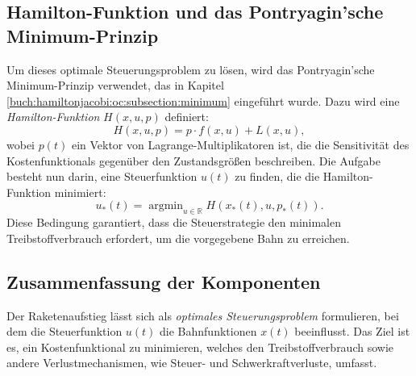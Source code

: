 \subsection{Hamilton-Funktion und das Pontryagin’sche Minimum-Prinzip}

Um dieses optimale Steuerungsproblem zu lösen, wird das Pontryagin'sche Minimum-Prinzip verwendet, das in Kapitel \ref{buch:hamiltonjacobi:oc:subsection:minimum} eingeführt wurde. Dazu wird eine \textit{Hamilton-Funktion} \(H(x,u,p)\) definiert:
\[
H(x,u,p) = p \cdot f(x,u) + L(x,u),
\]
wobei \(p(t)\) ein Vektor von Lagrange-Multiplikatoren ist, die die Sensitivität des Kostenfunktionals gegenüber den Zustandsgrößen beschreiben. Die Aufgabe besteht nun darin, eine Steuerfunktion \(u(t)\) zu finden, die die Hamilton-Funktion minimiert:
\[
u_*(t) = \operatorname{argmin}_{u \in \mathbb{R}} H(x_*(t), u, p_*(t)).
\]
Diese Bedingung garantiert, dass die Steuerstrategie den minimalen Treibstoffverbrauch erfordert, um die vorgegebene Bahn zu erreichen.

\subsection{Zusammenfassung der Komponenten}
%
%

Der Raketenaufstieg lässt sich als \textit{optimales Steuerungsproblem} formulieren, bei dem die Steuerfunktion \( u(t) \) die Bahnfunktionen \( x(t) \) beeinflusst. 
Das Ziel ist es, ein Kostenfunktional zu minimieren, welches den Treibstoffverbrauch sowie andere Verlustmechanismen, wie Steuer- und Schwerkraftverluste, umfasst.

